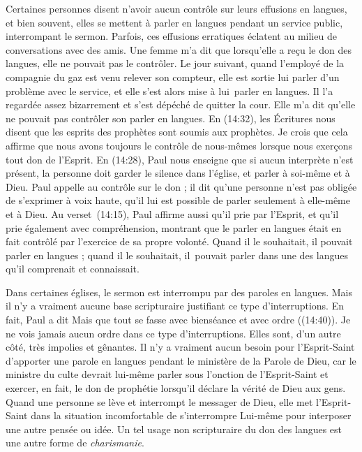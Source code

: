 Certaines personnes disent n'avoir aucun contrôle sur leurs effusions
 en langues, et bien souvent, elles se mettent à parler en langues
 pendant un service public, interrompant le sermon.
 Parfois, ces effusions erratiques éclatent au milieu de conversations
 avec des amis. Une femme m'a dit que lorsqu'elle a reçu le don des langues,
 elle ne pouvait pas le contrôler. Le jour suivant, quand l'employé de la
 compagnie du gaz est venu relever son compteur, elle est sortie
 lui parler d'un problème avec le service, et elle s'est alors mise
 à lui~parler en langues. Il l'a regardée assez bizarrement
 et s'est dépéché de quitter la cour.
 Elle m'a dit qu'elle ne pouvait pas contrôler son parler en langues.
 En (14:32), les Écritures nous disent que les esprits
 des prophètes sont soumis aux prophètes. Je crois que cela affirme
 que nous avons toujours le contrôle de nous-mêmes lorsque nous exerçons
 tout don de l'Esprit. En (14:28), Paul nous enseigne
 que si aucun interprète n'est présent, la personne doit garder
 le silence dans l'église, et parler à soi-même et à Dieu.
 Paul appelle au contrôle sur le don ; il dit qu'une personne n'est pas
 obligée de s'exprimer à voix haute, qu'il lui est possible de parler
 seulement à elle-même et à Dieu. Au verset~(14:15),
 Paul affirme aussi qu'il prie par l'Esprit, et qu'il prie également
 avec compréhension, montrant que le parler en langues était en fait
 contrôlé par l'exercice de sa propre volonté. Quand il le souhaitait,
 il pouvait parler en langues ; quand il le souhaitait, il~pouvait parler
 dans une des langues qu'il comprenait et connaissait.

Dans certaines églises, le sermon est interrompu par des paroles en langues.
 Mais il n'y a vraiment aucune base scripturaire justifiant ce type
 d'interruptions. En fait, Paul a dit\frcolon{} \Og Mais que tout se fasse
 avec bienséance et avec ordre \Fg{} ((14:40)).
 Je ne vois jamais aucun ordre dans ce type d'interruptions.
 Elles sont, d'un autre côté, très impolies et gênantes.
 Il n'y a vraiment aucun besoin pour l'Esprit-Saint d'apporter une parole
 en langues pendant le ministère de la Parole de Dieu, car le ministre
 du culte devrait lui-même parler sous l'onction de l'Esprit-Saint
 et exercer, en fait, le don de prophétie lorsqu'il déclare
 la vérité de Dieu aux gens. Quand une personne se lève et interrompt
 le messager de Dieu, elle met l'Esprit-Saint dans la situation
 incomfortable de s'interrompre Lui-même pour interposer une autre pensée
 ou idée. Un tel usage non scripturaire du don des langues est une autre
 forme de \emph{charismanie}.


